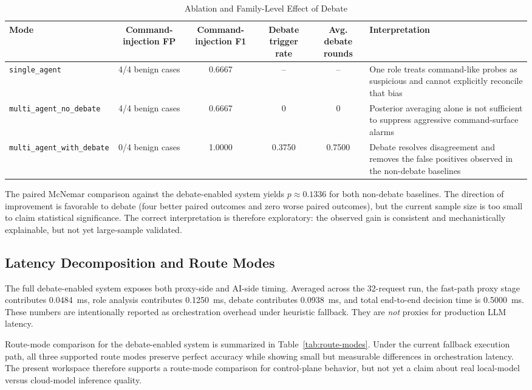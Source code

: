 \documentclass{ieeeaccess}
\begin{document}
\begin{table}[!t]
\caption{Ablation and Family-Level Effect of Debate}
\label{tab:ablation}
\centering
\small
\begin{tabularx}{\textwidth}{lccccY}
\toprule
\textbf{Mode} & \textbf{Command-injection FP} & \textbf{Command-injection F1} & \textbf{Debate trigger rate} & \textbf{Avg. debate rounds} & \textbf{Interpretation} \\
\midrule
\texttt{single\_agent} & 4/4 benign cases & 0.6667 & -- & -- & One role treats command-like probes as suspicious and cannot explicitly reconcile that bias \\
\texttt{multi\_agent\_no\_debate} & 4/4 benign cases & 0.6667 & 0 & 0 & Posterior averaging alone is not sufficient to suppress aggressive command-surface alarms \\
\texttt{multi\_agent\_with\_debate} & 0/4 benign cases & 1.0000 & 0.3750 & 0.7500 & Debate resolves disagreement and removes the false positives observed in the non-debate baselines \\
\bottomrule
\end{tabularx}
\end{table}

The paired McNemar comparison against the debate-enabled system yields $p \approx 0.1336$ for both non-debate baselines. The direction of improvement is favorable to debate (four better paired outcomes and zero worse paired outcomes), but the current sample size is too small to claim statistical significance. The correct interpretation is therefore exploratory: the observed gain is consistent and mechanistically explainable, but not yet large-sample validated.

\subsection{Latency Decomposition and Route Modes}
The full debate-enabled system exposes both proxy-side and AI-side timing. Averaged across the 32-request run, the fast-path proxy stage contributes 0.0484~ms, role analysis contributes 0.1250~ms, debate contributes 0.0938~ms, and total end-to-end decision time is 0.5000~ms. These numbers are intentionally reported as orchestration overhead under heuristic fallback. They are \emph{not} proxies for production LLM latency.

Route-mode comparison for the debate-enabled system is summarized in Table~\ref{tab:route-modes}. Under the current fallback execution path, all three supported route modes preserve perfect accuracy while showing small but measurable differences in orchestration latency. The present workspace therefore supports a route-mode comparison for control-plane behavior, but not yet a claim about real local-model versus cloud-model inference quality.
\end{document}
